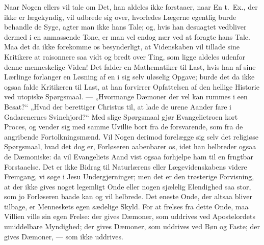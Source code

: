 \documentclass[12pt,a4paper]{book}
\begin{document}
Naar Nogen ellers vil tale om Det, han aldeles ikke forstaaer, naar En t.\ Ex., der ikke er
lægekyndig, vil udbrede sig over, hvorledes Lægerne egentlig burde behandle de Syge, agter
man ikke hans Tale; og, hvis han desuagtet vedbliver dermed i en anmassende Tone, er man vel
endog nær ved at foragte hans Tale. Maa det da ikke forekomme os besynderligt, at
Videnskaben vil tillade sine Kritikere at raisonnere saa vidt og bredt over Ting, som ligge
aldeles udenfor denne menneskelige Viden! Det falder en Mathematiker til Last, hvis han af
sine Lærlinge
forlanger en Løsning af en i sig selv uløselig Opgave; burde det da ikke ogsaa falde
Kritikeren til Last, at han forvirrer Opfattelsen af den hellige Historie ved utopiske
Spørgsmaal. --- „Hvormange Dæmoner der vel kan rummes i een Besat?“ „Hvad der berettiger
Christus til, at lade de urene Aander fare i Gadarenernes Svinehjord?“ Med slige Spørgsmaal
gjør Evangelietroen kort Proces, og vender sig med samme Uvillie bort fra de forsvarende,
som fra de angribende Fortolkningsmænd. Vil Nogen derimod forelægge sig selv det religiøse
Spørgsmaal, hvad det dog er, Forløseren aabenbarer os, idet han helbreder ogsaa de
Dæmoniske: da vil Evangeliets Aand vist ogsaa forhjelpe ham til en frngtbar Forstaaelse. Det
er ikke Bidrag til Naturlærens eller Lægevidenskabens videre Fremgang, vi søge i Jesu
Undergjerninger; men det er den trøsterige Forvisning, at der ikke gives noget legemligt
Onde eller nogen sjælelig Elendighed saa stor, som jo Forløseren baade kan og vil helbrede.
Det eneste Onde, der altsaa bliver tilbage, er Menneskets egen sædelige Skyld. For at
frelses fra dette Onde, maa Villien ville sin egen Frelse: der gives Dæmoner, som uddrives
ved Apostelordets umiddelbare Myndighed; der gives Dæmoner, som uddrives ved Bøn og Faste;
der gives Dæmoner, --- som ikke uddrives.
\end{document}

